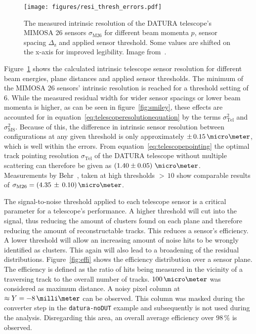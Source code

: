 \begin{figure}[tbp]
\centering

\texttt{[image: figures/resi\_thresh\_errors.pdf]}
\caption[Telescope intrinsic sensor resolution for different threshold settings, beam momenta and geometries~\cite{ref:thomas}]{The measured intrinsic resolution of the DATURA telescope's MIMOSA 26 sensors $\sigma_{\textrm{M26}}$ for different beam momenta $p$, sensor spacing $\Delta_{\textrm{z}}$ and applied sensor threshold.
Some values are shifted on the x-axis for improved legibility.
Image from~\cite{ref:thomas}.}
\label{fig:resivsenergy}
\end{figure}

Figure~\ref{fig:resivsenergy} shows the calculated intrinsic telescope sensor resolution for different beam energies, plane distances and applied sensor thresholds.
The minimum of the MIMOSA 26 sensors' intrinsic resolution is reached for a threshold setting of $6$.
While the measured residual width for wider sensor spacings or lower beam momenta is higher, as can be seen in figure~\ref{fig:smiley}, these effects are accounted for in equation~\ref{eq:telescoperesolutionequation} by the terms $\sigma_{\textrm{Tel}}^2$ and $\sigma_{\textrm{MS}}^2$.
Because of this, the difference in intrinsic sensor resolution between configurations at any given threshold is only approximately $\pm\,0.15\,\micro\meter$, which is well within the errors.
From equation~\ref{eq:telescopepointing} the optimal track pointing resolution $\sigma_{\textrm{Tel}}$ of the DATURA telescope without multiple scattering can therefore be given as $\left( 1.40 \pm 0.05 \right)\,\micro\meter$.\\
Measurements by Behr~\cite{ref:j.behrmeasurements}, taken at high thresholds $>\,10$ show comparable results of $\sigma_{\textrm{M26}} = (4.35\,\pm\,0.10)\,\micro\meter$.

The signal-to-noise threshold applied to each telescope sensor is a critical parameter for a telescope's performance.
A higher threshold will cut into the signal, thus reducing the amount of clusters found on each plane and therefore reducing the amount of reconstructable tracks.
This reduces a sensor's efficiency.
A lower threshold will allow an increasing amount of noise hits to be wrongly identified as clusters.
This again will also lead to a broadening of the residual distributions.
Figure~\ref{fig:effi} shows the efficiency distribution over a sensor plane.
The efficiency is defined as the ratio of hits being measured in the vicinity of a traversing track to the overall number of tracks.
$100\,\micro\meter$ was considered as maximum distance.
A noisy pixel column at $\approx Y = -8\,\milli\meter$ can be observed.
This column was masked during the converter step in the \texttt{datura-noDUT} example and subsequently is not used during the analysis.
Disregarding this area, an overall average efficiency over $98\,\%$ is observed.

